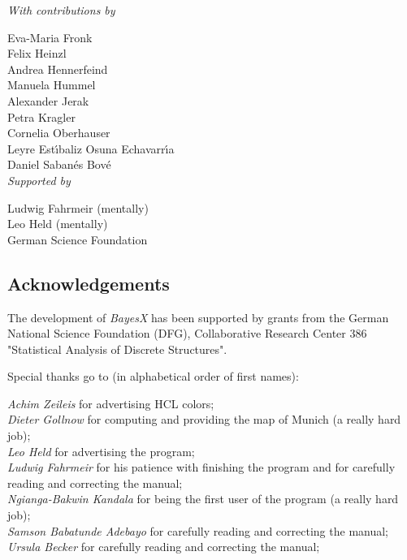 {\em With contributions by}

Eva-Maria Fronk\\
Felix Heinzl\\
Andrea Hennerfeind\\
Manuela Hummel\\
Alexander Jerak\\
Petra Kragler\\
Cornelia Oberhauser\\
Leyre Est\'{\i}baliz Osuna Echavarr\'{\i}a\\
Daniel Saban\'{e}s Bov\'{e}\\

{\em Supported by}

Ludwig Fahrmeir (mentally)\\
Leo Held (mentally)\\
German Science Foundation


\newpage

\subsection*{Acknowledgements}

The development of {\em BayesX} has been supported by grants from
the German National Science Foundation (DFG), Collaborative Research
Center 386 "Statistical Analysis of Discrete Structures".

Special thanks go to (in alphabetical order of first names):

{\em Achim Zeileis} for advertising HCL colors; \\
{\em Dieter Gollnow} for computing and providing the map of Munich (a really hard job); \\
{\em Leo Held} for advertising the program; \\
{\em Ludwig Fahrmeir} for his patience with finishing the program
and for carefully
reading and correcting the  manual; \\
{\em Ngianga-Bakwin Kandala} for being the first user of the program (a really hard job); \\
{\em Samson Babatunde Adebayo} for carefully reading and correcting the manual; \\
{\em Ursula Becker} for carefully reading and correcting the
manual;

